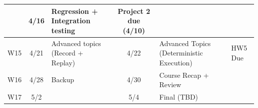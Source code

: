 \documentclass[letterpaper,11pt]{article}
\begin{document}
\begin{tabular}{l|cp{}|cp{}|l}
                                           & 4/16& Regression + Integration testing
         & 	 Project 2 due (4/10) \\  \hline
  W15 	& 4/21 & 	Advanced topics (Record + Replay)
                                        & 4/22& 	Advanced
                                                Topics (Deterministic
                                                Execution)  & HW5 Due	 \\  \hline
  W16 	& 4/28 & 	Backup
                                        & 4/30& 	Course Recap +
                                                Review &	 \\  \hline
  W17 	& 5/2 &
                                        & 5/4& Final (TBD) \\ \hline
\end{tabular}
\end{document}

